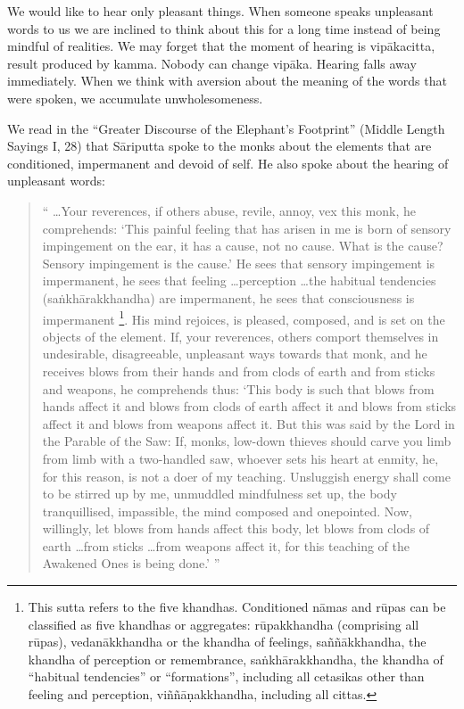 \documentclass{book}
\begin{document}
We would like to hear only pleasant things. When someone speaks
unpleasant words to us we are inclined to think about this for a long
time instead of being mindful of realities. We may forget that the
moment of hearing is vip{\=a}kacitta, result produced by kamma. Nobody
can change vip{\=a}ka. Hearing falls away immediately. When we think
with aversion about the meaning of the words that were spoken, we
accumulate unwholesomeness.

We read in the ``Greater Discourse of the Elephant's Footprint'' (Middle
Length Sayings I, 28) that S{\=a}riputta spoke to the monks about the
elements that are conditioned, impermanent and devoid of self. He also
spoke about the hearing of unpleasant words:


\begin{quote}\begin{flushleft}
`` \ldots Your reverences, if others abuse, revile, annoy, vex this monk, he
comprehends: `This painful feeling that has arisen in me is born of
sensory impingement on the ear, it has a cause, not no cause. What is
the cause? Sensory impingement is the cause.' He sees that sensory
impingement is impermanent, he sees that feeling \ldots perception \ldots the
habitual tendencies (sa\.nkh{\=a}rakkhandha) are impermanent, he sees
that consciousness is impermanent
\footnote{This sutta refers to the five khandhas.
Conditioned n{\=a}mas and r\=upas can be classified as five khandhas or
aggregates: r\=upakkhandha (comprising all r\=upas), vedan{\=a}kkhandha
or the khandha of feelings, sa\~n\~n{\=a}kkhandha, the khandha of
perception or remembrance, sa\.nkh{\=a}rakkhandha, the khandha of
``habitual tendencies'' or ``formations'', including all cetasikas
other than feeling and perception, vi\~n\~n{\=a}\d nakkhandha, including
all cittas.}. His mind rejoices, is pleased, composed, and is set on
the objects of the element. If, your reverences, others comport
themselves in undesirable, disagreeable, unpleasant ways towards that
monk, and he receives blows from their hands and from clods of earth
and from sticks and weapons, he comprehends thus: `This body is such
that blows from hands affect it and blows from clods of earth affect it
and blows from sticks affect it and blows from weapons affect it. But
this was said by the Lord in the Parable of the Saw: If, monks,
low-down thieves should carve you limb from limb with a two-handled
saw, whoever sets his heart at enmity, he, for this reason, is not a
doer of my teaching. Unsluggish energy shall come to be stirred up by
me, unmuddled mindfulness set up, the body tranquillised, impassible,
the mind composed and onepointed. Now, willingly, let blows from hands
affect this body, let blows from clods of earth \ldots from sticks \ldots from
weapons affect it, for this teaching of the Awakened Ones is being
done.' ''
\end{flushleft}\end{quote}
\end{document}

